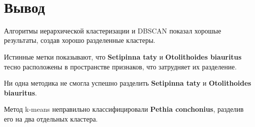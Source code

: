 \documentclass[14pt,a4paper,oneside]{extarticle}
\begin{document}
    \begin{center}
    \end{center}
    { \hspace*{\fill} \\}
    
\clearpage

    \hypertarget{ux432ux44bux432ux43eux434}{%
\section*{Вывод}\label{ux432ux44bux432ux43eux434}}

  Алгоритмы иерархической кластеризации и DBSCAN показал хорошые
  результаты, создав хорошо разделенные кластеры.

  Истинные метки показывают, что \textbf{Setipinna taty} и
  \textbf{Otolithoides biauritus} тесно расположены в пространстве
  признаков, что затрудняет их разделение.

  Ни одна методика не смогла успешно разделить \textbf{Setipinna taty} и
  \textbf{Otolithoides biauritus}.

  Метод k-means неправильно классифицировали \textbf{Pethia conchonius},
  разделив его на два отдельных кластера.
\end{document}
